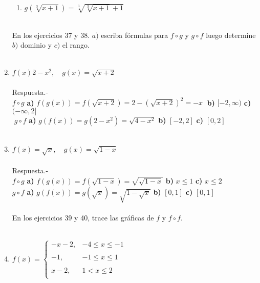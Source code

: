 \begin{enumerate}[\bfseries 1.]
\begin{enumerate}[\bfseries a)]
	\item $g(\sqrt[3]{x+1}) = \sqrt[3]{\sqrt[3]{x+1}+1}$\\\\

    \end{enumerate}

En los ejercicios 37 y 38. $a)$ escriba fórmulas para $f\circ g$ y $g\circ f$ luego determine $b)$ dominio y $c)$ el rango.\\\\

\item $f(x) 2 - x^2, \quad g(x) = \sqrt{x+2}$\\\\
    Respuesta.-\; \\ $f\circ g$ \textbf{a)} $f(g(x)) = f(\sqrt{x+2}) = 2 - (\sqrt{x+2})^2 = -x\;$ \textbf{b)} $[-2,\infty)$ \textbf{c)} $(-\infty,2]$ \\
    $\;g\circ f$ \textbf{a)} $g(f(x)) = g(2-x^2) = \sqrt{4-x^2}$ \textbf{b)} $[-2,2]$ \textbf{c)} $[0,2]$\\\\



\item $f(x) = \sqrt{x},\quad g(x) = \sqrt{1-x}$\\\\
    Respuesta.-\; \\
    $f\circ g$ \textbf{a)} $f(g(x)) = f(\sqrt{1 - x}) =  \sqrt{\sqrt{1 - x}}$ \textbf{b)} $x\leq 1$ \textbf{c)} $x\leq 2$\\
    $g\circ f$ \textbf{a)} $g(f(x)) = g(\sqrt{x}) = \sqrt{1 - \sqrt{x}}$ \textbf{b)} $[0,1]$ \textbf{c)} $[0,1]$\\\\

En los ejercicios 39 y 40, trace las gráficas de $f$ y $f\circ f$.\\\\

\item $f(x) =  \left\{\begin{array}{lr}
	-x-2,&-4\leq x \leq -1\\\\
	-1,&-1\leq x \leq 1\\\\
	x-2,&1<x\leq 2\\
    \end{array}\right.$
    \vspace{.5cm}


\end{enumerate}
